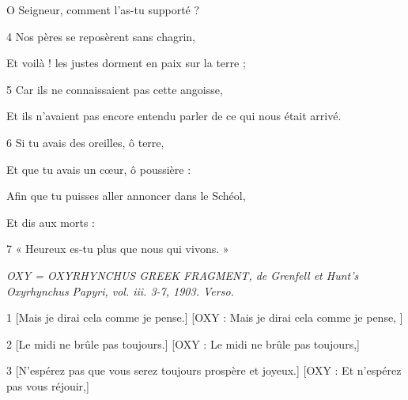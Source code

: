 \par O Seigneur, comment l'as-tu supporté ?

\par 4 Nos pères se reposèrent sans chagrin,

\par Et voilà ! les justes dorment en paix sur la terre ;

\par 5 Car ils ne connaissaient pas cette angoisse,

\par Et ils n'avaient pas encore entendu parler de ce qui nous était arrivé.

\par 6 Si tu avais des oreilles, ô terre,

\par Et que tu avais un cœur, ô poussière :

\par Afin que tu puisses aller annoncer dans le Schéol,

\par Et dis aux morts :

\par 7 « Heureux es-tu plus que nous qui vivons. »


\par \textit{OXY = OXYRHYNCHUS GREEK FRAGMENT, de Grenfell et Hunt's Oxyrhynchus Papyri, vol. iii. 3-7, 1903. Verso.}

\par 1 [Mais je dirai cela comme je pense.] [OXY : Mais je dirai cela comme je pense, ]

\par [Et je parlerai contre toi, ô pays qui prospère toujours.] [OXY : Et je parlerai contre toi, pays qui prospère.]

\par 2 [Le midi ne brûle pas toujours.] [OXY : Le midi ne brûle pas toujours,]

\par [Les rayons du soleil ne donnent pas non plus constamment de lumière.] [OXY : Les rayons du soleil ne donnent pas non plus constamment de lumière.]

\par 3 [N'espérez pas que vous serez toujours prospère et joyeux.] [OXY : Et n'espérez pas vous réjouir,]

\par [Et ne soyez pas trop élevé et vantard.] [OXY : Ne condamnez pas non plus grandement.]

